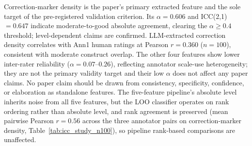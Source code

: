 Correction-marker density is the paper's primary extracted feature and the sole target of the pre-registered validation criterion. Its $\alpha=0.606$ and ICC(2,1)$=0.647$ indicate moderate-to-good absolute agreement, clearing the $\alpha\geq0.4$ threshold; level-dependent claims are confirmed. LLM-extracted correction density correlates with Ann1 human ratings at Pearson $r=0.360$ ($n=100$), consistent with moderate construct overlap. The other four features show lower inter-rater reliability ($\alpha = 0.07$--$0.26$), reflecting annotator scale-use heterogeneity; they are not the primary validity target and their low $\alpha$ does not affect any paper claims. No paper claim should be drawn from consistency, specificity, confidence, or elaboration as standalone features. The five-feature pipeline's absolute level inherits noise from all five features, but the LOO classifier operates on rank ordering rather than absolute level, and rank agreement is preserved (mean pairwise Pearson $r = 0.56$ across the three annotator pairs on correction-marker density, Table~\ref{tab:icc_study_n100}), so pipeline rank-based comparisons are unaffected.
